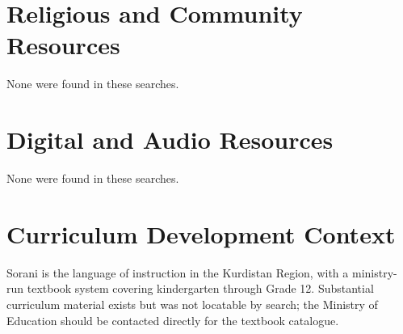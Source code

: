 \documentclass[12pt]{article}
\begin{document}
\section{Religious and Community Resources}
None were found in these searches.

\section{Digital and Audio Resources}
None were found in these searches.

\section{Curriculum Development Context}
Sorani is the language of instruction in the Kurdistan Region, with a ministry-run textbook system covering kindergarten through Grade 12. Substantial curriculum material exists but was not locatable by search; the Ministry of Education should be contacted directly for the textbook catalogue.
\end{document}
